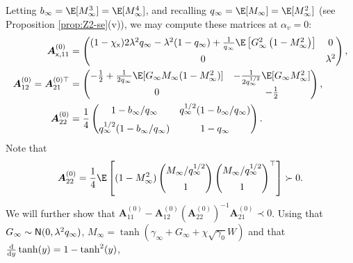\documentclass[]{article}
\def\sx{{\mathsf x}}
\def\de{{\rm d}}
\def\normal{{\sf N}}
\def\bA{{\boldsymbol A}}
\def\de{{\rm d}}
\def\normal{{\sf N}}
\def\bA{{\boldsymbol A}}
\begin{document}
Letting $b_\infty = \E[M_\infty^3] = \E[M_\infty^4]$, and recalling $q_\infty = \E[M_\infty] = \E[M_\infty^2]$ (see Proposition \ref{prop:Z2-se}(v)),
we may compute these matrices at $\alpha_v = 0$:
\begin{equation}
\begin{aligned}
    \bA^{(0)}_{\sx,11} 
        &=
        \begin{pmatrix}
            (1-\chi_{\sx})2\lambda^2 q_\infty 
            - \lambda^2(1 - q_\infty)
            + 
            \frac{1}{q_\infty}
            \E\left[G_\infty^2\left(1-M_\infty^2\right)\right]
            & 0 \\[5pt]
            0 & \lambda^2 
        \end{pmatrix},
    \\
    \bA^{(0)}_{12} 
        =
        \bA^{(0)\top}_{21} 
        &= 
        \begin{pmatrix}
            -\frac{1}{2} + \frac1{2q_\infty} \E[G_\infty M_\infty(1-M_\infty^2)]
            & -\frac{1}{2q_\infty^{1/2}} \E[G_\infty M_\infty^2]
            \\[5pt]
            0 & - \frac12 
        \end{pmatrix},
    \\
    \bA^{(0)}_{22}
        &=
        \frac14
        \begin{pmatrix}
            1 - b_\infty/q_\infty
            & 
            q_\infty^{1/2}(1 -b_\infty/q_\infty)
            \\[5pt]
            q_\infty^{1/2}(1 -b_\infty/q_\infty)
            & 
            1 - q_\infty
        \end{pmatrix}.
\end{aligned}
\end{equation}
Note that
\begin{equation}
    \bA_{22}^{(0)}
    =
    \frac14 
    \E\left[
        (1-M_\infty^2)
        \begin{pmatrix}
            M_\infty/q_\infty^{1/2} \\[5pt] 1
        \end{pmatrix}
        \begin{pmatrix}
            M_\infty/q_\infty^{1/2} \\[5pt] 1
        \end{pmatrix}^\top
    \right] \succ 0.
\end{equation}
We will further show that $\bA_{11}^{(0)} - \bA_{12}^{(0)} (\bA_{22}^{(0)})^{-1} \bA_{21}^{(0)} \prec 0$.
Using that $G_\infty \sim \normal(0,\lambda^2 q_\infty)$, $M_\infty = \tanh(\gamma_\infty + G_\infty + \chi \sqrt{\gamma_0}W)$ and that $\frac{\de}{\de y} \tanh(y) = 1 - \tanh^2(y)$, 
\end{document}
